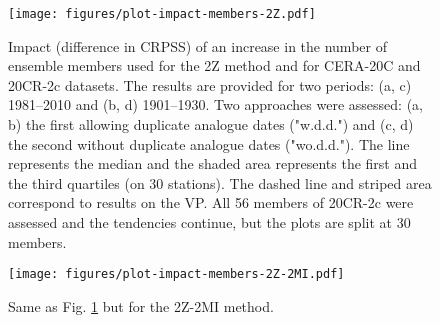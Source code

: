 \documentclass{ametsoc}
\begin{document}
\begin{figure}[t]
	\noindent\texttt{[image: figures/plot-impact-members-2Z.pdf]}\\
	\caption{Impact (difference in CRPSS) of an increase in the number of ensemble members used for the 2Z method and for CERA-20C and 20CR-2c datasets. The results are provided for two periods: (a, c) 1981--2010 and (b, d) 1901--1930. Two approaches were assessed: (a, b) the first allowing duplicate analogue dates ("w.d.d.") and (c, d) the second without duplicate analogue dates ("wo.d.d."). The line represents the median and the shaded area represents the first and the third quartiles (on 30 stations). The dashed line and striped area correspond to results on the VP. All 56 members of 20CR-2c were assessed and the tendencies continue, but the plots are split at 30 members.}
	\label{fig:plot_impact_members_2Z}
\end{figure}

\begin{figure}[t]
	\noindent\texttt{[image: figures/plot-impact-members-2Z-2MI.pdf]}\\
	\caption{Same as Fig. \ref{fig:plot_impact_members_2Z} but for the 2Z-2MI method.}
	\label{fig:plot_impact_members_2Z-2MI}
\end{figure}
\end{document}
